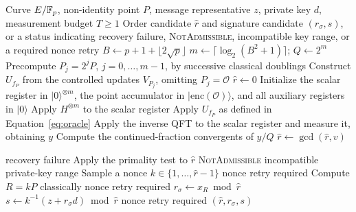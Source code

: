 \begin{algorithm}[t]
    \color{blue}
    \caption{Hybrid ECDSA-like signing with probabilistic order recovery}
    \label{alg:hybrid}
    \begin{algorithmic}[1]
        \Require Curve $E/\mathbb{F}_p$, non-identity point $P$, message representative $z$, private key $d$, measurement budget $T\geq1$
        \Ensure Order candidate $\hat r$ and signature candidate $(r_{\sigma},s)$, or a status indicating recovery failure, \textsc{NotAdmissible}, incompatible key range, or a required nonce retry      
        \State $B\gets p+1+\lfloor2\sqrt p\rfloor$
        \State $m\gets\lceil\log_2(B^2+1)\rceil$;
        $Q\gets2^m$
        \State Precompute $P_j=2^jP$, $j=0,\ldots,m-1$, by successive classical doublings
        \State Construct $U_{f_P}$ from the controlled updates $V_{P_j}$, omitting $P_j=\mathcal O$
        \State $\hat r\gets0$
            \State Initialize the scalar register in $\lvert0\rangle^{\otimes m}$, the point accumulator in $\lvert\mathrm{enc}(\mathcal O)\rangle$, and all auxiliary registers in $\lvert0\rangle$
            \State Apply $H^{\otimes m}$ to the scalar register
            \State Apply $U_{f_P}$ as defined in Equation~\eqref{eq:oracle}
            \State Apply the inverse QFT to the scalar register and measure it, obtaining $y$
            \State Compute the continued-fraction convergents of $y/Q$
                    \State $\hat r\gets\gcd(\hat r,v)$
                \EndIf
            \EndFor
        \EndFor
        
            \State \Return recovery failure
        \EndIf
        \State Apply the primality test to $\hat r$
            \State \Return \textsc{NotAdmissible}
        \EndIf
            \State \Return incompatible private-key range
        \EndIf
        \State Sample a nonce $k\in\{1,\ldots,\hat r-1\}$
            \State \Return nonce retry required
        \EndIf
        \State Compute $R=kP$ classically
            \State \Return nonce retry required
        \EndIf
        \State $r_{\sigma}\gets x_R\bmod\hat r$
        \State $s\gets k^{-1}(z+r_{\sigma}d)\bmod\hat r$
            \State \Return nonce retry required
        \EndIf
        \State \Return $(\hat r,r_{\sigma},s)$
    \end{algorithmic}
\end{algorithm}

